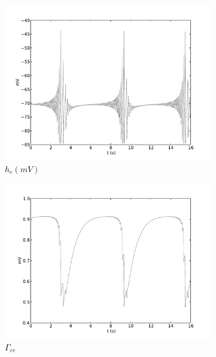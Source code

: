 \documentclass[a4paper,12pt]{article}
\begin{document}
\begin{figure}
	\begin{subfigure}[b]{0.5\textwidth}
		\includegraphics[scale=0.35]{frontiers-2012-images-revised/biphasic-gamma_yml-00460_ode-burst-psp-res_yml-mod-res-0_9-2-1-1_yml-he-intra.pdf}
		\caption{$h_e (mV)$}
	\end{subfigure}
	\begin{subfigure}[b]{0.5\textwidth}
		\includegraphics[scale=0.35]{frontiers-2012-images-revised/biphasic-gamma_yml-00460_ode-burst-psp-res_yml-mod-res-0_9-2-1-1_yml-T_ee-intra.pdf}
		\caption{$\Gamma_{ee}$}
	\end{subfigure}
	\begin{subfigure}[b]{0.5\textwidth}

\end{subfigure}
\end{figure}
\end{document}
